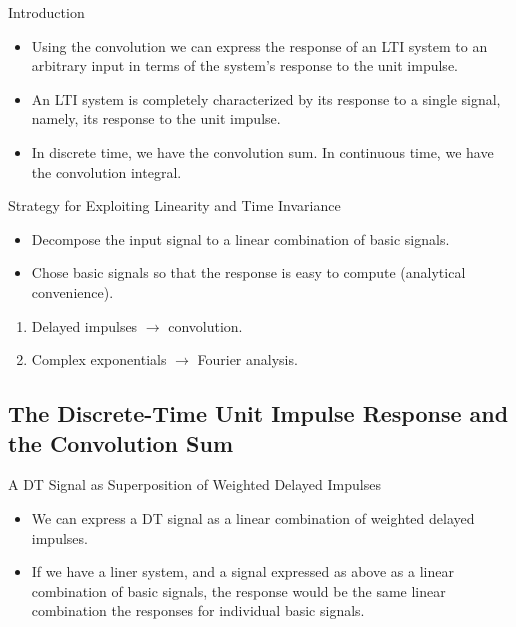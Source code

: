 \begin{frame}{Introduction}
    \begin{itemize}
        \item Using the convolution we can express the response of an LTI system to an arbitrary input in terms of the system's response to the \alert{unit impulse}.
        \item An LTI system is completely characterized by its response to a single signal, namely, its response to the unit impulse.
        \item In discrete time, we have the \alert{convolution sum}. In continuous time, we have the \alert{convolution integral}.
    \end{itemize}
\end{frame}

\begin{frame}{Strategy for Exploiting Linearity and Time Invariance}
    {
    \begin{itemize}
        \item Decompose the input signal to a linear combination of basic signals.
        \item   Chose basic signals so that the response is easy to compute (analytical convenience).
    \end{itemize}

    \begin{enumerate}
        \item Delayed impulses $\rightarrow$ convolution.
        \item Complex exponentials $\rightarrow$ Fourier analysis.
    \end{enumerate}
    }
\end{frame}


\subsection{The Discrete-Time Unit Impulse Response and the Convolution Sum}

\begin{frame}{A DT Signal as  Superposition of Weighted Delayed Impulses}
    \begin{itemize}
      \item We can express a DT signal as a linear combination of weighted delayed impulses.
      \item If we have a liner system, and a signal expressed as above as a linear combination of basic signals, the response would be the same linear combination  the responses for individual basic signals.
    \end{itemize}

\end{frame}


